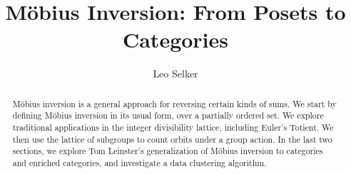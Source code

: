 \documentclass[12pt]{pom_thesis}
\author{Leo Selker}
\title{M\"obius Inversion: From Posets to Categories}
\begin{document}
\maketitle

\begin{abstract}  M\"obius inversion is a general approach for reversing certain kinds of sums. We start by defining M\"obius inversion in its usual form, over a partially ordered set. We explore traditional applications in the integer divisibility lattice, including Euler's Totient. We then use the lattice of subgroups to count orbits under a group action. In the last two sections, we explore Tom Leinster's generalization of M\"obius inversion to categories and enriched categories, and investigate a data clustering algorithm.
\end{abstract}

\tableofcontents
\end{document}

